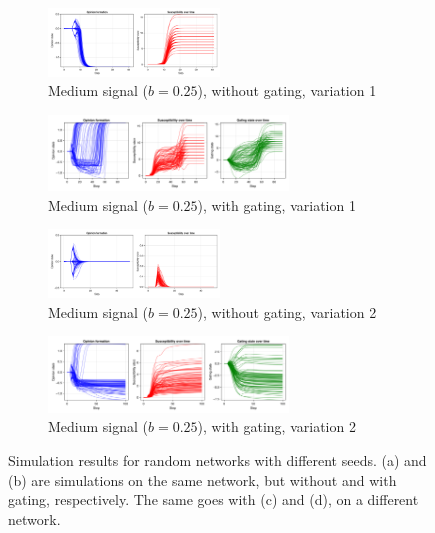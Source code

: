 \documentclass[]{article}
\begin{document}
\begin{figure}
	\begin{subfigure}{\linewidth}
		\centering
		\includegraphics[width=0.5\textwidth]{../plots/nvar0_nog_homd_mediumsig_g05_er4_s92391_10000} 
		\caption{Medium signal ($b = 0.25$), without gating, variation 1}  \label{fig:er11}
	\end{subfigure}

	\begin{subfigure}{\linewidth}
		\centering
		\includegraphics[width=0.7\textwidth]{../plots/nvar0_wg_homd_mediumsig_g05_er4_a2_taux5_s92391_10000}
		\caption{Medium signal ($b = 0.25$), with gating, variation 1} \label{fig:er12}
	\end{subfigure}
	
	\begin{subfigure}{\linewidth}
		\centering
		\includegraphics[width=0.5\textwidth]{../plots/nvar0_nog_homd_medsig_g05_er4_s2854} 
		\caption{Medium signal ($b = 0.25$), without gating, variation 2}  \label{fig:er21}
	\end{subfigure}

	\begin{subfigure}{\linewidth}
		\centering
		\includegraphics[width=0.7\textwidth]{../plots/nvar0_wg_homd_mediumsig_g05_er4_a2_taux5_s2854_10000}
		\caption{Medium signal ($b = 0.25$), with gating, variation 2} \label{fig:er22}
	\end{subfigure}
	\caption{Simulation results for random networks with different seeds. (a) and (b) are simulations on the same network, but without and with gating, respectively. The same goes with (c) and (d), on a different network.}
	\label{fig:ergraph}
\end{figure}
\end{document}
